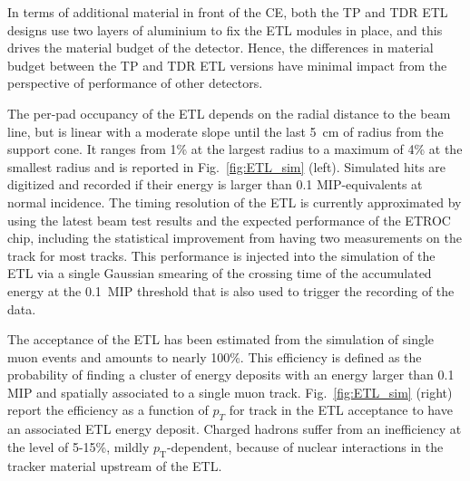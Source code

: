 In terms of additional material in front of the CE, both the TP and TDR ETL designs use two layers of aluminium to fix the ETL modules in place, and this drives the material budget of the detector. Hence, the differences in material budget between the TP and TDR ETL versions have minimal impact from the perspective of performance of other detectors. 


The per-pad occupancy of the ETL depends on the radial distance to the beam line, but is linear with a moderate slope until the last 5~cm of radius from the support cone. It ranges from 1\% at the largest radius to a maximum of 4\% at the smallest radius and is reported in Fig.~\ref{fig:ETL_sim} (left).
Simulated hits are digitized and recorded if their energy is larger than 0.1 MIP-equivalents at normal incidence. The timing resolution of the ETL is currently approximated by using the latest beam test results and the expected performance of the ETROC chip, including the statistical improvement from having two measurements on the track for most tracks. This performance is injected into the simulation of the ETL via a single Gaussian smearing of the crossing time of the accumulated energy at the 0.1~MIP threshold that is also used to trigger the recording of the data. 

The acceptance of the ETL has been estimated from the simulation of single muon events and amounts to nearly 100\%. This efficiency is defined as the probability of finding a cluster of energy deposits with an energy larger than 0.1 MIP and spatially associated to a single muon track. 
Fig.~\ref{fig:ETL_sim} (right) report the efficiency as a function of $p_{T}$ for track in the ETL acceptance to have an associated ETL energy deposit. Charged hadrons suffer from an inefficiency at the level of 5-15\%, mildly $p_{\text{T}}$-dependent, because of nuclear interactions in the tracker material upstream of the ETL.

